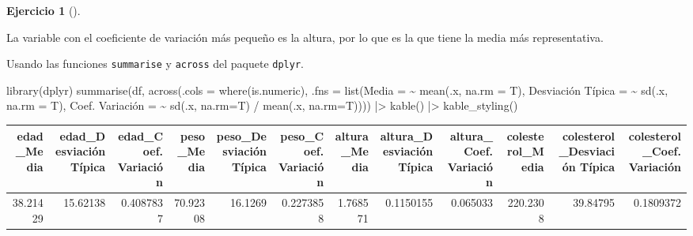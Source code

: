 \documentclass[
  a4paper,
]{scrreport}
\newenvironment{Shaded}{\begin{snugshade}}{\end{snugshade}}
\newcommand{\AttributeTok}[1]{\textcolor[rgb]{0.40,0.45,0.13}{#1}}
\newcommand{\ErrorTok}[1]{\textcolor[rgb]{0.68,0.00,0.00}{#1}}
\newcommand{\FunctionTok}[1]{\textcolor[rgb]{0.28,0.35,0.67}{#1}}
\newcommand{\NormalTok}[1]{\textcolor[rgb]{0.00,0.23,0.31}{#1}}
\newcommand{\OtherTok}[1]{\textcolor[rgb]{0.00,0.23,0.31}{#1}}
\newcommand{\SpecialCharTok}[1]{\textcolor[rgb]{0.37,0.37,0.37}{#1}}
\newcommand{\StringTok}[1]{\textcolor[rgb]{0.13,0.47,0.30}{#1}}
\theoremstyle{definition}
\newtheorem{exercise}{Ejercicio}[chapter]
\theoremstyle{remark}
\begin{document}
\begin{exercise}[]
\begin{enumerate}
\begin{tcolorbox}
  La variable con el coeficiente de variación más pequeño es la altura,
  por lo que es la que tiene la media más representativa.

  \end{tcolorbox}

  \begin{tcolorbox}[enhanced jigsaw, coltitle=black, left=2mm, colback=white, leftrule=.75mm, toptitle=1mm, breakable, bottomrule=.15mm, titlerule=0mm, bottomtitle=1mm, title=\textcolor{quarto-callout-tip-color}{\faLightbulb}\hspace{0.5em}{Solución 2}, arc=.35mm, toprule=.15mm, rightrule=.15mm, colframe=quarto-callout-tip-color-frame, opacityback=0, colbacktitle=quarto-callout-tip-color!10!white, opacitybacktitle=0.6]

  Usando las funciones \texttt{summarise} y \texttt{across} del paquete
  \texttt{dplyr}.

\begin{Shaded}
\begin{Highlighting}[]
\FunctionTok{library}\NormalTok{(dplyr)}
\FunctionTok{summarise}\NormalTok{(df, }\FunctionTok{across}\NormalTok{(}\AttributeTok{.cols =} \FunctionTok{where}\NormalTok{(is.numeric), }\AttributeTok{.fns =} \FunctionTok{list}\NormalTok{(}\AttributeTok{Media =} \SpecialCharTok{\textasciitilde{}} \FunctionTok{mean}\NormalTok{(.x, }\AttributeTok{na.rm =}\NormalTok{ T), }\StringTok{\textasciigrave{}}\AttributeTok{Desviación Típica}\StringTok{\textasciigrave{}} \OtherTok{=} \ErrorTok{\textasciitilde{}} \FunctionTok{sd}\NormalTok{(.x, }\AttributeTok{na.rm =}\NormalTok{ T), }\StringTok{\textasciigrave{}}\AttributeTok{Coef. Variación}\StringTok{\textasciigrave{}} \OtherTok{=} \ErrorTok{\textasciitilde{}} \FunctionTok{sd}\NormalTok{(.x, }\AttributeTok{na.rm=}\NormalTok{T) }\SpecialCharTok{/} \FunctionTok{mean}\NormalTok{(.x, }\AttributeTok{na.rm=}\NormalTok{T)))) }\SpecialCharTok{|\textgreater{}}
\FunctionTok{kable}\NormalTok{() }\SpecialCharTok{|\textgreater{}}
\FunctionTok{kable\_styling}\NormalTok{()}
\end{Highlighting}
\end{Shaded}

  \begin{table}
  \centering
  \begin{tabular}{r|r|r|r|r|r|r|r|r|r|r|r}
  \hline
  edad\_Media & edad\_Desviación Típica & edad\_Coef. Variación & peso\_Media & peso\_Desviación Típica & peso\_Coef. Variación & altura\_Media & altura\_Desviación Típica & altura\_Coef. Variación & colesterol\_Media & colesterol\_Desviación Típica & colesterol\_Coef. Variación\\
  \hline
  38.21429 & 15.62138 & 0.4087837 & 70.92308 & 16.1269 & 0.2273858 & 1.768571 & 0.1150155 & 0.065033 & 220.2308 & 39.84795 & 0.1809372\\
  \hline
  \end{tabular}
  \end{table}


\end{tcolorbox}
\end{enumerate}
\end{exercise}
\end{document}
